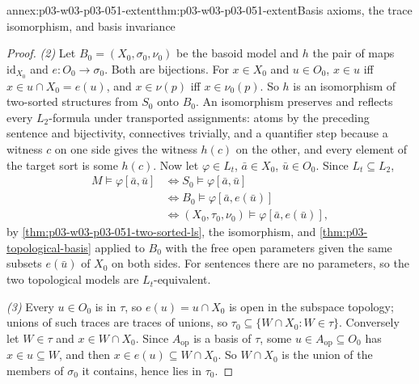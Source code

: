 \begin{annexitem}{annex:p03-w03-p03-051-extent}{thm:p03-w03-p03-051-extent}{Basis axioms, the trace isomorphism, and basis invariance}
\begin{proof}
\emph{(2)} Let \(B_0=(X_0,\sigma_0,\nu_0)\) be the basoid model and
\(h\) the pair of maps \(\mathrm{id}_{X_0}\) and \(e:O_0\to\sigma_0\).
Both are bijections. For \(x\in X_0\) and \(u\in O_0\), \(x\in u\) iff
\(x\in u\cap X_0=e(u)\), and \(x\in\nu(p)\) iff \(x\in\nu_0(p)\). So \(h\)
is an isomorphism of two-sorted structures from \(S_0\) onto \(B_0\). An
isomorphism preserves and reflects every \(L_2\)-formula under
transported assignments: atoms by the preceding sentence and bijectivity,
connectives trivially, and a quantifier step because a witness \(c\) on
one side gives the witness \(h(c)\) on the other, and every element of
the target sort is some \(h(c)\). Now let \(\varphi\in L_t\),
\(\bar a\in X_0\), \(\bar u\in O_0\). Since \(L_t\subseteq L_2\),
\[
\begin{aligned}
 M\models\varphi[\bar a,\bar u]
 &\iff S_0\models\varphi[\bar a,\bar u]\\
 &\iff B_0\models\varphi[\bar a,e(\bar u)]\\
 &\iff (X_0,\tau_0,\nu_0)\models\varphi[\bar a,e(\bar u)],
\end{aligned}
\]
by \cref{thm:p03-w03-p03-051-two-sorted-ls}, the isomorphism, and
\cref{thm:p03-topological-basis} applied to \(B_0\) with the free open
parameters given the same subsets \(e(\bar u)\) of \(X_0\) on both sides.
For sentences there are no parameters, so the two topological models are
\(L_t\)-equivalent.

\emph{(3)} Every \(u\in O_0\) is in \(\tau\), so \(e(u)=u\cap X_0\) is
open in the subspace topology; unions of such traces are traces of unions,
so \(\tau_0\subseteq\{W\cap X_0:W\in\tau\}\). Conversely let \(W\in\tau\)
and \(x\in W\cap X_0\). Since \(A_{\mathrm{op}}\) is a basis of \(\tau\),
some \(u\in A_{\mathrm{op}}\subseteq O_0\) has \(x\in u\subseteq W\), and
then \(x\in e(u)\subseteq W\cap X_0\). So \(W\cap X_0\) is the union of the
members of \(\sigma_0\) it contains, hence lies in \(\tau_0\).
\end{proof}
\end{annexitem}

